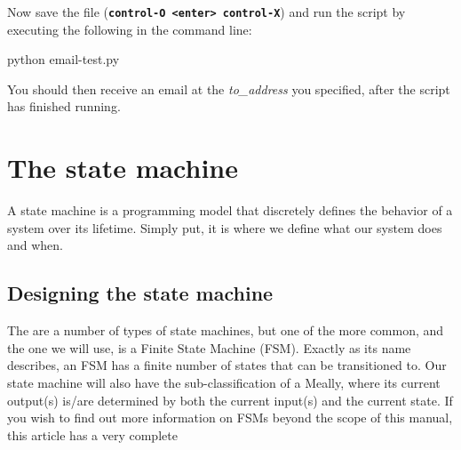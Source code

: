 \documentclass{article}
\newcommand*{\myfont}{\fontfamily{pcr}\selectfont}
\newcommand{\codeb}[2]{
  \begin{tcolorbox}[width=\textwidth,colback={SpringGreen},title={#1},colbacktitle=darkgreen,coltitle=SpringGreen]
    \myfont
    #2
  \end{tcolorbox}
} %
\begin{document}
    \newline
    \noindent
    Now save the file (\textbf{\texttt{control-O <enter> control-X}}) and run the script by executing the following in the command line:
    \codeb{Run the test script for email}{
      python email-test.py
    }
    You should then receive an email at the \textit{to\_address} you specified, after the script has finished running.
\section{The state machine}
A state machine is a programming model that discretely defines the behavior of a system over its lifetime. Simply put, it is where we define what our system does and when.
  \subsection{Designing the state machine}
  The are a number of types of state machines, but one of the more common, and the one we will use, is a Finite State Machine (FSM). Exactly as its name describes, an FSM has a finite number of states that can be transitioned to. Our state machine will also have the sub-classification of a Meally, where its current output(s) is/are determined by both the current input(s) and the current state. If you wish to find out more information on FSMs beyond the scope of this manual, this article has a very complete
\end{document}
